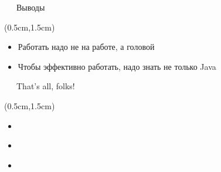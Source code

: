 \documentclass[xetex,18pt,aspectratio=43]{beamer}
\begin{document}
\begin{Large}
\begin{frame}{\ \ \ Выводы}
\begin{textblock*}{\framewidth-0.8cm}(0.5cm,1.5cm)
\begin{itemize}
  \item Работать надо не на работе, а головой
  \item Чтобы эффективно работать, надо знать не только Java
\end{itemize}
\end{textblock*}
\end{frame}

\begin{frame}{\ \ \ That's all, folks!}
\begin{textblock*}{\framewidth-0.8cm}(0.5cm,1.5cm)
\begin{itemize}
  \item \href{mailto:alexclear@gmail.com}{\color{blue}{alexclear@gmail.com}}
  \item \href{https://telegram.me/lhommequipleure}{\color{blue}{https://telegram.me/lhommequipleure}}
  \item \href{https://telegram.me/demeliorator\_pod}{\color{blue}{https://telegram.me/demeliorator\_pod}}
\end{itemize}
\end{textblock*}
\end{frame}

\end{Large}
\end{document}
